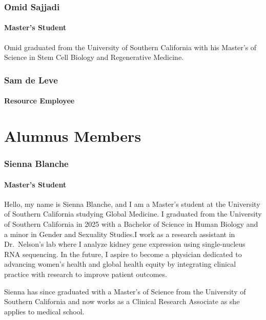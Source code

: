 \documentclass[
]{article}
\begin{document}
\subsubsection{Omid Sajjadi}\label{omid-sajjadi}

\paragraph{Master's Student}\label{masters-student-1}

Omid graduated from the University of Southern California with his
Master's of Science in Stem Cell Biology and Regenerative Medicine.

\subsubsection{Sam de Leve}\label{sam-de-leve}

\paragraph{Resource Employee}\label{resource-employee}

\section{Alumnus Members}\label{alumnus-members}

\subsubsection{Sienna Blanche}\label{sienna-blanche}

\paragraph{Master's Student}\label{masters-student-2}

Hello, my name is Sienna Blanche, and I am a Master's student at the
University of Southern California studying Global Medicine. I graduated
from the University of Southern California in 2025 with a Bachelor of
Science in Human Biology and a minor in Gender and Sexuality Studies.I
work as a research assistant in Dr.~Nelson's lab where I analyze kidney
gene expression using single-nucleus RNA sequencing. In the future, I
aspire to become a physician dedicated to advancing women's health and
global health equity by integrating clinical practice with research to
improve patient outcomes.

Sienna has since graduated with a Master's of Science from the
University of Southern California and now works as a Clinical Research
Associate as she applies to medical school.
\end{document}
